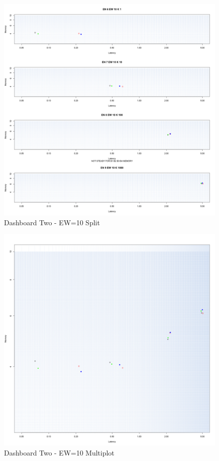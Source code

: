 \begin{figure}[htb]
	\centering
	\includegraphics[width=0.90\linewidth]{images/dashboard-2-split}	
	\caption{Dashboard Two - EW=10 Split} 
	\label{fig:result_dashboard_ewa}
\end{figure}

\begin{figure}[htb]
	\centering
	\includegraphics[width=0.90\linewidth]{images/dashboard-2}	
	\caption{Dashboard Two - EW=10 Multiplot} 
	\label{fig:result_dashboard_ewb}
\end{figure}


